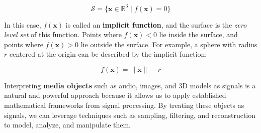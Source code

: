 \[
\mathcal{S} = \{ \mathbf{x} \in \mathbb{R}^3 \mid f(\mathbf{x}) = 0 \}
\]

In this case, \( f(\mathbf{x}) \) is called an \textbf{implicit function}, and the surface is the \textit{zero level set} of this function. Points where \( f(\mathbf{x}) < 0 \) lie inside the surface, and points where \( f(\mathbf{x}) > 0 \) lie outside the surface. For example, a sphere with radius \( r \) centered at the origin can be described by the implicit function:

\[
f(\mathbf{x}) = \|\mathbf{x}\| - r
\]





Interpreting \textbf{media objects} such as audio, images, and 3D models as signals is a natural and powerful approach because it allows us to apply established mathematical frameworks from signal processing. By treating these objects as signals, we can leverage techniques such as sampling, filtering, and reconstruction to model, analyze, and manipulate them.

